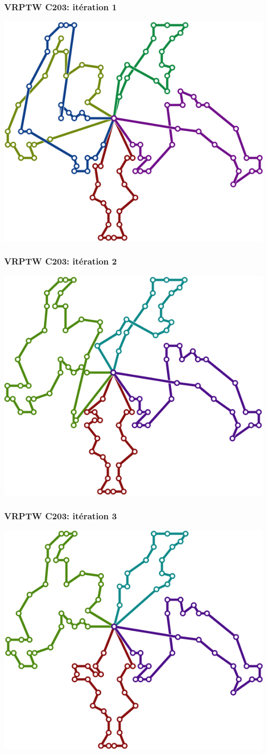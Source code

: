 \documentclass[table]{beamer}
\begin{document}
\begin{frame}
  \frametitle{VRPTW C203: itération 1}

  \centering
  \includegraphics[width=0.7\linewidth]{../article/images/C203-1}
\end{frame}

\begin{frame}
  \frametitle{VRPTW C203: itération 2}

  \centering
  \includegraphics[width=0.7\linewidth]{../article/images/C203-2}
\end{frame}

\begin{frame}
  \frametitle{VRPTW C203: itération 3}

  \centering
  \includegraphics[width=0.7\linewidth]{../article/images/C203-3}
\end{frame}
\end{document}
